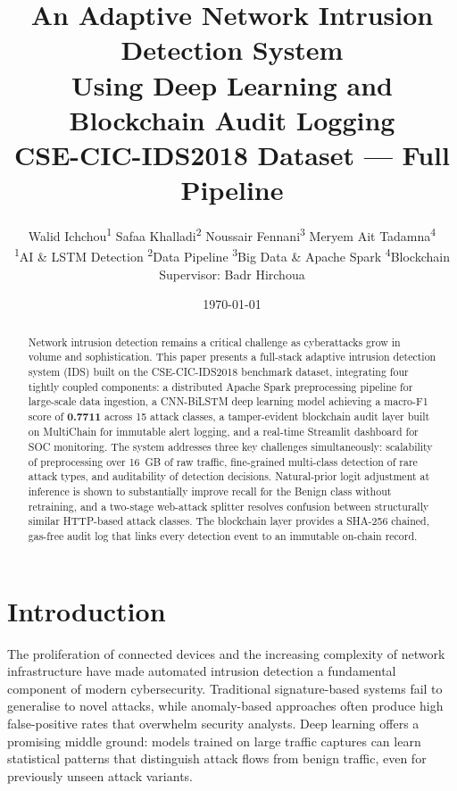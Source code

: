 \documentclass[12pt]{article}
\title{\textbf{An Adaptive Network Intrusion Detection System\\
Using Deep Learning and Blockchain Audit Logging}\\[0.5em]
\large CSE-CIC-IDS2018 Dataset — Full Pipeline}
\author{
  Walid Ichchou\textsuperscript{1} \quad
  Safaa Khalladi\textsuperscript{2} \quad
  Noussair Fennani\textsuperscript{3} \quad
  Meryem Ait Tadamna\textsuperscript{4}\\[0.4em]
  \small\textsuperscript{1}AI \& LSTM Detection \quad
  \textsuperscript{2}Data Pipeline \quad
  \textsuperscript{3}Big Data \& Apache Spark \quad
  \textsuperscript{4}Blockchain\\[0.4em]
  Supervisor: Badr Hirchoua
}
\date{\today}
\theoremstyle{plain}
\begin{document}
\maketitle

\begin{abstract}
Network intrusion detection remains a critical challenge as cyberattacks grow in volume and sophistication. This paper presents a full-stack adaptive intrusion detection system (IDS) built on the CSE-CIC-IDS2018 benchmark dataset, integrating four tightly coupled components: a distributed Apache Spark preprocessing pipeline for large-scale data ingestion, a CNN-BiLSTM deep learning model achieving a macro-F1 score of \textbf{0.7711} across 15 attack classes, a tamper-evident blockchain audit layer built on MultiChain for immutable alert logging, and a real-time Streamlit dashboard for SOC monitoring. The system addresses three key challenges simultaneously: scalability of preprocessing over 16~GB of raw traffic, fine-grained multi-class detection of rare attack types, and auditability of detection decisions. Natural-prior logit adjustment at inference is shown to substantially improve recall for the Benign class without retraining, and a two-stage web-attack splitter resolves confusion between structurally similar HTTP-based attack classes. The blockchain layer provides a SHA-256 chained, gas-free audit log that links every detection event to an immutable on-chain record.
\end{abstract}

\tableofcontents
\clearpage
\listoffigures
\newpage
\listoftables
\newpage

\section*{Introduction}

The proliferation of connected devices and the increasing complexity of network infrastructure have made automated intrusion detection a fundamental component of modern cybersecurity. Traditional signature-based systems fail to generalise to novel attacks, while anomaly-based approaches often produce high false-positive rates that overwhelm security analysts. Deep learning offers a promising middle ground: models trained on large traffic captures can learn statistical patterns that distinguish attack flows from benign traffic, even for previously unseen attack variants.
\end{document}
